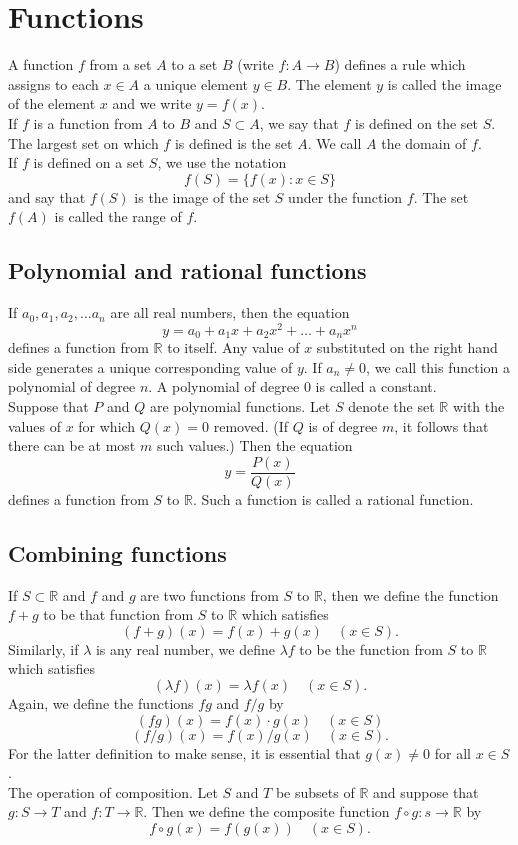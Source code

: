 \documentclass[10pt, a4paper]{article}
\newcommand{\R}{\mathbb{R}}
\begin{document}
\newpage

\section{Functions}
A function $f$ from a set $A$ to a set $B$ (write $f : A \rightarrow B$) defines a rule which assigns to each $x \in A$ a unique element $y \in B$. The element $y$ is called the image of the element $x$ and we write $y = f(x)$.
\\
If $f$ is a function from $A$ to $B$ and $S \subset A$, we say that $f$ is defined on the set $S$. The largest set on which $f$ is defined is the set $A$. We call $A$ the domain of $f$.
\\
If $f$ is defined on a set $S$, we use the notation
$$f(S) = \{f(x) : x \in S\}$$
and say that $f(S)$ is the image of the set $S$ under the function $f$. The set $f(A)$ is called the range of $f$.

\subsection{Polynomial and rational functions}
If $a_0, a_1, a_2, \dotsc a_n$ are all real numbers, then the equation
$$y = a_0 + a_1x + a_2x ^ 2 + \dotsc + a_nx ^ n$$
defines a function from $\R$ to itself. Any value of $x$ substituted on the right hand side generates a unique corresponding value of $y$. If $a_n \neq 0$, we call this function a polynomial of degree $n$. A polynomial of degree $0$ is called a constant. \\
Suppose that $P$ and $Q$ are polynomial functions. Let $S$ denote the set $\R$ with the values of $x$ for which $Q(x) = 0$ removed. (If $Q$ is of degree $m$, it follows that there can be at most $m$ such values.) Then the equation
$$y = \frac{P(x)}{Q(x)}$$
defines a function from $S$ to $\R$. Such a function is called a rational function.

\subsection{Combining functions}
If $S \subset \R$ and $f$ and $g$ are two functions from $S$ to $\R$, then we define the function $f + g$ to be that function from $S$ to $\R$ which satisfies
$$(f + g)(x) = f(x) + g(x)\quad(x \in S).$$
Similarly, if $\lambda$ is any real number, we define $\lambda f$ to be the function from $S$ to $\R$ which satisfies
$$(\lambda f)(x) = \lambda f(x)\quad(x \in S).$$
Again, we define the functions $fg$ and $f/g$ by
$$(fg)(x) = f(x) \cdot g(x)\quad(x \in S)$$
$$(f/g)(x) = f(x)/g(x)\quad(x \in S).$$
For the latter definition to make sense, it is essential that $g(x) \neq 0$ for all $x \in S$.
\\
The operation of composition. Let $S$ and $T$ be subsets of $\R$ and suppose that $g: S \rightarrow T$ and $f : T \rightarrow \R$. Then we define the composite function $f \circ g: s \rightarrow \R$ by
$$f \circ g(x) = f(g(x))\quad(x \in S).$$
\end{document}
